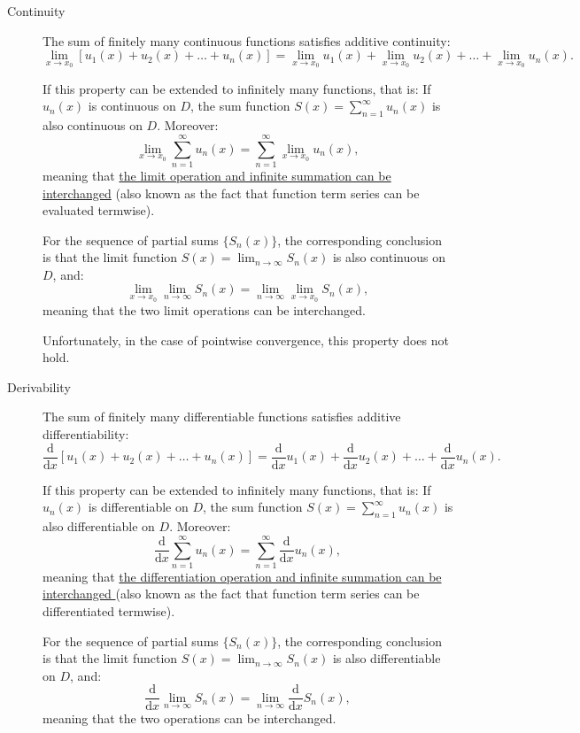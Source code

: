 \documentclass[11pt]{../../TexTemplate/elegantbook}
\begin{document}
\begin{description}
    \item[Continuity]
    The sum of finitely many continuous functions satisfies additive continuity:
    \[
    \lim_{x \to x_0} [u_1(x) + u_2(x) + \dots + u_n(x)] 
    = \lim_{x \to x_0} u_1(x) + \lim_{x \to x_0} u_2(x) + \dots + \lim_{x \to x_0} u_n(x).
    \]

    If this property can be extended to infinitely many functions, that is:
    If \( u_n(x) \) is continuous on \( D \), the sum function \( S(x) = \sum_{n=1}^\infty u_n(x) \) 
    is also continuous on \( D \). Moreover:
    \[
    \lim_{x \to x_0} \sum_{n=1}^\infty u_n(x) = \sum_{n=1}^\infty \lim_{x \to x_0} u_n(x),
    \]
    meaning that \underline{the limit operation and infinite summation can be interchanged}
    (also known as the fact that function term series can be evaluated termwise).

    For the sequence of partial sums \( \{ S_n(x) \} \), 
    the corresponding conclusion is that the limit function 
    \( S(x) = \lim_{n \to \infty} S_n(x) \) is also continuous on \( D \), and:
    \[
    \lim_{x \to x_0} \lim_{n \to \infty} S_n(x) = \lim_{n \to \infty} \lim_{x \to x_0} S_n(x),
    \]
    meaning that the two limit operations can be interchanged.

    Unfortunately, in the case of pointwise convergence, this property \textcolor{red!70}{does not hold}.

    \item[Derivability]
    The sum of finitely many differentiable functions satisfies additive differentiability:
    \[
    \frac{\mathrm{d}}{\mathrm{d}x} [u_1(x) + u_2(x) + \dots + u_n(x)] 
    = \frac{\mathrm{d}}{\mathrm{d}x} u_1(x) + \frac{\mathrm{d}}{\mathrm{d}x} u_2(x) + \dots + \frac{\mathrm{d}}{\mathrm{d}x} u_n(x).
    \]

    If this property can be extended to infinitely many functions, that is:
    If \( u_n(x) \) is differentiable on \( D \), 
    the sum function \( S(x) = \sum_{n=1}^\infty u_n(x) \) is also differentiable on \( D \). Moreover:
    \[
    \frac{\mathrm{d}}{\mathrm{d}x} \sum_{n=1}^\infty u_n(x) = \sum_{n=1}^\infty \frac{\mathrm{d}}{\mathrm{d}x} u_n(x),
    \]
    meaning that \underline{the differentiation operation and infinite summation can be interchanged }
    (also known as the fact that function term series can be differentiated termwise).

    For the sequence of partial sums \( \{ S_n(x) \} \), 
    the corresponding conclusion is that the limit function 
    \( S(x) = \lim_{n \to \infty} S_n(x) \) is also differentiable on \( D \), and:
    \[
    \frac{\mathrm{d}}{\mathrm{d}x} \lim_{n \to \infty} S_n(x) = \lim_{n \to \infty} \frac{\mathrm{d}}{\mathrm{d}x} S_n(x),
    \]
    meaning that the two operations can be interchanged.


\end{description}
\end{document}
